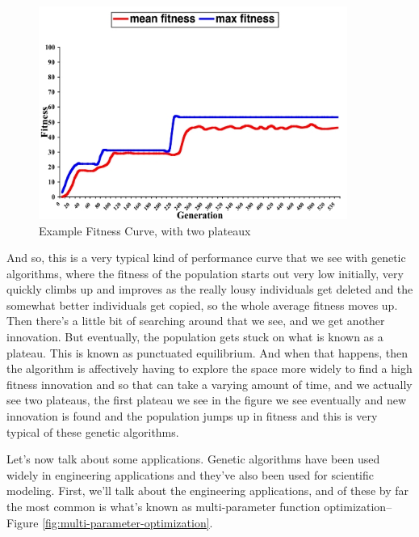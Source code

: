 \documentclass[]{article}
\begin{document}
\begin{figure}[H]
	\caption{Example Fitness Curve, with two plateaux}\label{fig:GAfitness}
	\includegraphics[width=0.9\textwidth]{GAfitness}
\end{figure}
And so, this is a very typical kind of
performance curve that we see with genetic
algorithms, where the fitness of the population
starts out very low initially, very quickly
climbs up and improves as the really lousy
individuals get deleted and the somewhat
better individuals get copied, so the whole
average fitness moves up.
Then there's a little bit of searching around
that we see, and we get another innovation.
But eventually, the population gets stuck
on what is known as a plateau.
This is known as punctuated equilibrium.
And when that happens, then the algorithm
is affectively having to explore the space
more widely to find a high fitness
innovation and so that can take a varying
amount of time, and we actually see two
plateaus, the first plateau we see in the figure
we see eventually and new innovation is found
and the population jumps up in fitness
and this is very typical of these
genetic algorithms.

Let's now talk about some applications.
Genetic algorithms have been used widely
in engineering applications and they've
also been used for scientific modeling.
First, we'll talk about the engineering
applications, and of these by far the
most common is what's known as
multi-parameter function optimization--Figure \ref{fig:multi-parameter-optimization}.
\end{document}

